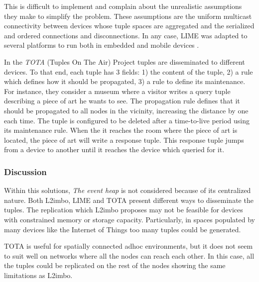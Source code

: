 This is difficult to implement and \citet{coulouris_distributed_2012} complain about the unrealistic assumptions they make to simplify the problem. %
These assumptions are the uniform multicast connectivity between devices whose tuple spaces are aggregated and the serialized and ordered connections and disconnections.
In any case, LIME was adapted to several platforms to run both in embedded and mobile devices \citep{murphy_transiently_2006}.


In the \emph{TOTA} (Tuples On The Air) Project \citep{mamei_programming_2009} tuples are disseminated to different devices.
To that end, each tuple has 3 fields:
1) the content of the tuple,
2) a rule which defines how it should be propagated,
3) a rule to define its maintenance.
For instance, they consider a museum where a visitor writes a query tuple describing a piece of art he wants to see.
The propagation rule defines that it should be propagated to all nodes in the vicinity, increasing the distance by one each time.
The tuple is configured to be deleted after a time-to-live period using its maintenance rule.
When the it reaches the room where the piece of art is located, the piece of art will write a response tuple.
This response tuple jumps from a device to another until it reaches the device which queried for it.



\subsubsection{Discussion}


Within this solutions, \emph{The event heap} is not considered because of its centralized nature.
Both L2imbo, LIME and TOTA present different ways to disseminate the tuples.
The replication which L2imbo proposes may not be feasible for devices with constrained memory or storage capacity.
Particularly, in spaces populated by many devices like the Internet of Things too many tuples could be generated.

TOTA is useful for spatially connected adhoc environments, but it does not seem to suit well on networks where all the nodes can reach each other.
In this case, all the tuples could be replicated on the rest of the nodes showing the same limitations as L2imbo.%

